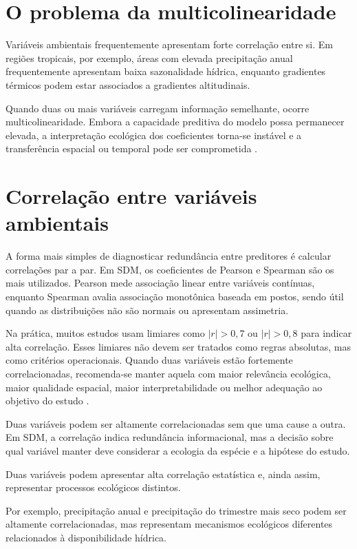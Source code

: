 \section{O problema da multicolinearidade}

Variáveis ambientais frequentemente apresentam forte correlação entre si. Em regiões tropicais, por exemplo, áreas com elevada precipitação anual frequentemente apresentam baixa sazonalidade hídrica, enquanto gradientes térmicos podem estar associados a gradientes altitudinais.

Quando duas ou mais variáveis carregam informação semelhante, ocorre multicolinearidade. Embora a capacidade preditiva do modelo possa permanecer elevada, a interpretação ecológica dos coeficientes torna-se instável e a transferência espacial ou temporal pode ser comprometida \parencite{dormann2013collinearity}.

\section{Correlação entre variáveis ambientais}

A forma mais simples de diagnosticar redundância entre preditores é calcular correlações par a par. Em SDM, os coeficientes de Pearson e Spearman são os mais utilizados. Pearson mede associação linear entre variáveis contínuas, enquanto Spearman avalia associação monotônica baseada em postos, sendo útil quando as distribuições não são normais ou apresentam assimetria.

Na prática, muitos estudos usam limiares como \(|r| > 0{,}7\) ou \(|r| > 0{,}8\) para indicar alta correlação. Esses limiares não devem ser tratados como regras absolutas, mas como critérios operacionais. Quando duas variáveis estão fortemente correlacionadas, recomenda-se manter aquela com maior relevância ecológica, maior qualidade espacial, maior interpretabilidade ou melhor adequação ao objetivo do estudo \parencite{dormann2013collinearity,raes2018modeling}.

\begin{conceito}[title={\faBook\quad Correlação não é causalidade}]
	Duas variáveis podem ser altamente correlacionadas sem que uma cause a outra. Em SDM, a correlação indica redundância informacional, mas a decisão sobre qual variável manter deve considerar a ecologia da espécie e a hipótese do estudo.
\end{conceito}

\begin{conceito}[title={\faBook\quad Correlação não implica redundância ecológica}]
	Duas variáveis podem apresentar alta correlação estatística e, ainda assim, representar processos ecológicos distintos.
	
	Por exemplo, precipitação anual e precipitação do trimestre mais seco podem ser altamente correlacionadas, mas representam mecanismos ecológicos diferentes relacionados à disponibilidade hídrica.
\end{conceito}

